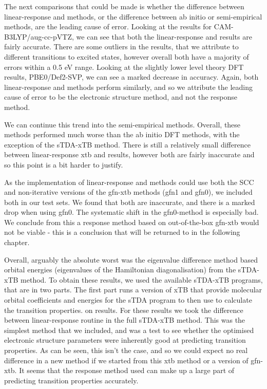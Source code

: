 The next comparisons that could be made is whether the difference between 
linear-response and \dscf methods, or the difference between ab initio or 
semi-empirical methods, are the leading cause of error. Looking at the results 
for CAM-B3LYP/aug-cc-pVTZ, we can see that both the linear-response and \dscf 
results are fairly accurate. There are some outliers in the \dscf results, that 
we attribute to different transitions to excited states, however overall both 
have a majority of errors within a 0.5 eV range. Looking at the slightly lower
level theory DFT results, PBE0/Def2-SVP, we can see a marked decrease in accuracy.
Again, both linear-response and \dscf methods perform similarly, and so we attribute
the leading cause of error to be the electronic structure method, and not the response method.

We can continue this trend into the semi-empirical methods. Overall, these methods
performed much worse than the ab initio DFT methods, with the exception of the
sTDA-xTB method. There is still a relatively small difference between linear-response
xtb and \dxtb results, however both are fairly inaccurate and so this point is a
bit harder to justify. 

As the implementation of linear-response and \dxtb methods could use both the
SCC and non-iterative versions of the gfn-xtb methods (gfn1 and gfn0), we included
both in our test sets. We found that both are inaccurate, and there is a marked
drop when using gfn0. The systematic shift in the gfn0-\dxtb method is especially
bad. We conclude from this a response method based on out-of-the-box gfn-xtb would
not be viable - this is a conclusion that will be returned to in the following
chapter.

Overall, arguably the absolute worst was the eigenvalue difference method based
orbital energies (eigenvalues of the Hamiltonian diagonalisation) from the sTDA-xTB
method. To obtain these results, we used the available sTDA-xTB programs, that are
in two parts. The first part runs a version of xTB that provide molecular orbital
coefficients and energies for the sTDA program to then use to calculate the transition
properties.
on  results. For these results we took the difference between
linear-response routine in the full sTDA-xTB method. This was the simplest method
that we included, and was a test to see whether the optimised electronic structure 
parameters were inherently good at predicting transition properties. As can be 
seen, this isn't the case, and so we could expect no real difference in a new
method if we started from this xtb method or a version of gfn-xtb. It seems that
the response method used can make up a large part of predicting transition properties
accurately.

